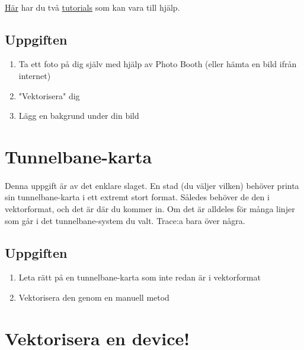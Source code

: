 \documentclass{article}
\begin{document}
    \paragraph{}
      \href{http://vector.tutsplus.com/tutorials/illustration/tracing-a-vector-face-from-a-reference-photo/}{Här}
      har du två
      \href{http://vector.tutsplus.com/tutorials/illustration/how-to-create-a-simple-vector-avatar-from-a-stock-image/}{tutorials}
      som kan vara till hjälp.

    \subsection*{ Uppgiften }
      \begin{enumerate}
        \item Ta ett foto på dig själv med hjälp av Photo Booth (eller hämta en bild ifrån internet)
        \item "Vektorisera" dig
        \item Lägg en bakgrund under din bild
      \end{enumerate}

      


  \newpage
  \section{ Tunnelbane-karta }
    \paragraph{}
    Denna uppgift är av det enklare slaget. En stad (du väljer vilken) behöver printa sin tunnelbane-karta i ett extremt stort format. Således behöver de den i vektorformat, och det är där du kommer in. Om det är alldeles för många linjer som går i det tunnelbane-system du valt. Trace:a bara över några.

    \subsection*{ Uppgiften }
      \begin{enumerate}
        \item Leta rätt på en tunnelbane-karta som inte redan är i vektorformat
        \item Vektorisera den genom en manuell metod
      \end{enumerate}



  \newpage
  \section{ Vektorisera en device! }
\end{document}
